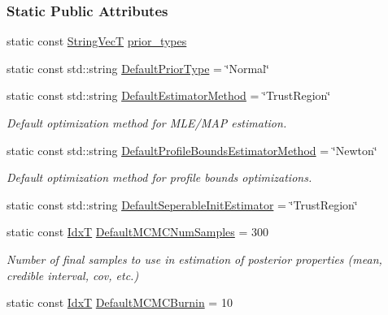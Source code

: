 \subsubsection*{Static Public Attributes}
\begin{DoxyCompactItemize}
\item 
static const \hyperlink{namespacemappel_aae88cf18bccfbb789a6019bcfbbfca68}{String\+VecT} \hyperlink{classmappel_1_1Gauss2DsModel_a9c23ad32b75a80271a0d5ac24138c5ee}{prior\+\_\+types}
\item 
static const std\+::string \hyperlink{classmappel_1_1Gauss2DsModel_ac00cce582449c74c64f624ec85c9e164}{Default\+Prior\+Type} = \char`\"{}Normal\char`\"{}
\item 
static const std\+::string \hyperlink{classmappel_1_1PointEmitterModel_aa90f02cfd2af6acf4d8ba3bbfbe906e5}{Default\+Estimator\+Method} = \char`\"{}Trust\+Region\char`\"{}
\begin{DoxyCompactList}\small\item\em Default optimization method for M\+L\+E/\+M\+AP estimation. \end{DoxyCompactList}\item 
static const std\+::string \hyperlink{classmappel_1_1PointEmitterModel_a5240568f2d7c7bad84e900d283b299dc}{Default\+Profile\+Bounds\+Estimator\+Method} = \char`\"{}Newton\char`\"{}
\begin{DoxyCompactList}\small\item\em Default optimization method for profile bounds optimizations. \end{DoxyCompactList}\item 
static const std\+::string \hyperlink{classmappel_1_1PointEmitterModel_ad8c3dc629d75d22f25855a5f1ba8729f}{Default\+Seperable\+Init\+Estimator} = \char`\"{}Trust\+Region\char`\"{}
\item 
static const \hyperlink{namespacemappel_ab17ec0f30b61ece292439d7ece81d3a8}{IdxT} \hyperlink{classmappel_1_1PointEmitterModel_a9bbed2f2e91f1e5f0f4f9389cd2de333}{Default\+M\+C\+M\+C\+Num\+Samples} = 300
\begin{DoxyCompactList}\small\item\em Number of final samples to use in estimation of posterior properties (mean, credible interval, cov, etc.) \end{DoxyCompactList}\item 
static const \hyperlink{namespacemappel_ab17ec0f30b61ece292439d7ece81d3a8}{IdxT} \hyperlink{classmappel_1_1PointEmitterModel_a6fc96e398771a33d5586c2af10a2e6d8}{Default\+M\+C\+M\+C\+Burnin} = 10

\end{DoxyCompactItemize}
